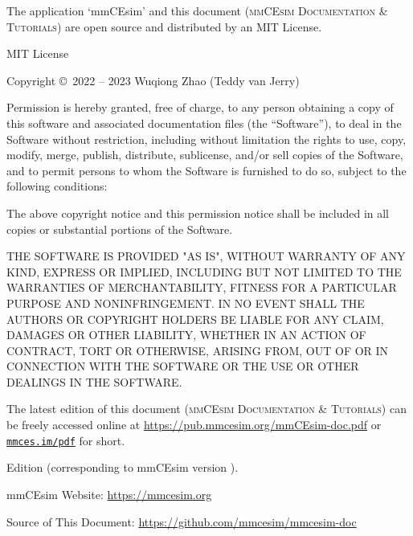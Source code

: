 \vspace*{-\fill}

\noindent
The application `mmCEsim' and this document
(\textsc{mmCEsim Documentation \& Tutorials})
are open source and distributed by an MIT License.
\newline

\noindent
MIT License
\newline

\noindent
Copyright \copyright~2022 -- 2023 Wuqiong Zhao (Teddy van Jerry)
\newline

\noindent
Permission is hereby granted, free of charge, to any person obtaining a copy
of this software and associated documentation files (the ``Software''), to deal
in the Software without restriction, including without limitation the rights
to use, copy, modify, merge, publish, distribute, sublicense, and/or sell
copies of the Software, and to permit persons to whom the Software is
furnished to do so, subject to the following conditions:
\newline

\noindent
The above copyright notice and this permission notice shall be included in all
copies or substantial portions of the Software.
\newline

\noindent
THE SOFTWARE IS PROVIDED "AS IS", WITHOUT WARRANTY OF ANY KIND, EXPRESS OR
IMPLIED, INCLUDING BUT NOT LIMITED TO THE WARRANTIES OF MERCHANTABILITY,
FITNESS FOR A PARTICULAR PURPOSE AND NONINFRINGEMENT. IN NO EVENT SHALL THE
AUTHORS OR COPYRIGHT HOLDERS BE LIABLE FOR ANY CLAIM, DAMAGES OR OTHER
LIABILITY, WHETHER IN AN ACTION OF CONTRACT, TORT OR OTHERWISE, ARISING FROM,
OUT OF OR IN CONNECTION WITH THE SOFTWARE OR THE USE OR OTHER DEALINGS IN THE
SOFTWARE.
\newline
\newline

\noindent
The latest edition of this document (\textsc{mmCEsim Documentation \& Tutorials})
can be freely accessed online at \url{https://pub.mmcesim.org/mmCEsim-doc.pdf}
or \href{https://mmces.im/pdf}{\texttt{mmces.im/pdf}} for short.
\newline

\noindent
Edition \mmCEsimDate{}
(corresponding to mmCEsim version \mmCEsimVersion).

\vfill
\noindent
mmCEsim Website: \url{https://mmcesim.org}

\noindent
Source of This Document: \url{https://github.com/mmcesim/mmcesim-doc}
